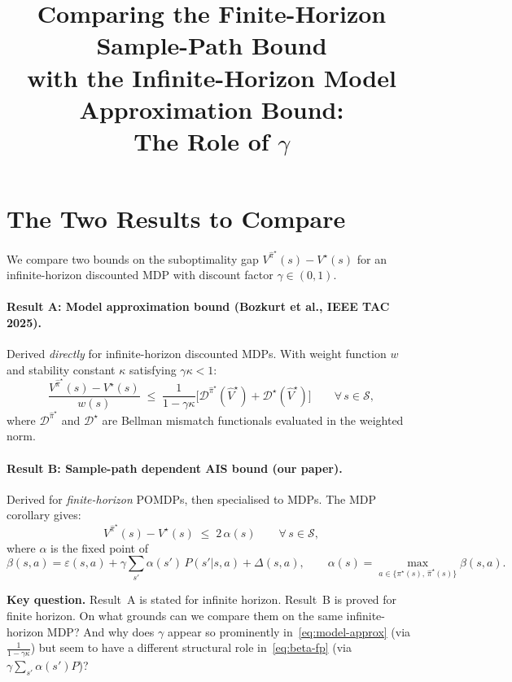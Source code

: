 \documentclass[11pt]{article}
\title{Comparing the Finite-Horizon Sample-Path Bound\\with the Infinite-Horizon Model Approximation Bound:\\The Role of $\gamma$}
\author{}
\date{}
\newcommand{\pistar}{\pi^\star}
\newcommand{\pihatstar}{\hat\pi^\star}
\newcommand{\Vstar}{V^\star}
\newcommand{\Vhatstar}{\hat V^\star}
\newcommand{\Vpihat}{V^{\pihatstar}}
\begin{document}
\maketitle

\section{The Two Results to Compare}

We compare two bounds on the suboptimality gap $\Vpihat(s) - \Vstar(s)$ for an
infinite-horizon discounted MDP with discount factor $\gamma \in (0,1)$.

\paragraph{Result A: Model approximation bound (Bozkurt et al., IEEE TAC 2025).}
Derived \emph{directly} for infinite-horizon discounted MDPs.  With weight
function $w$ and stability constant $\kappa$ satisfying $\gamma\kappa < 1$:
\begin{equation}\label{eq:model-approx}
  \frac{\Vpihat(s) - \Vstar(s)}{w(s)}
  \;\le\;
  \frac{1}{1 - \gamma\kappa}
  \bigl[\mathcal{D}^{\pihatstar}(\Vhatstar)
  + \mathcal{D}^\star(\Vhatstar)\bigr]
  \qquad \forall\, s \in \mathcal{S},
\end{equation}
where $\mathcal{D}^{\pihatstar}$ and $\mathcal{D}^\star$ are Bellman mismatch
functionals evaluated in the weighted norm.

\paragraph{Result B: Sample-path dependent AIS bound (our paper).}
Derived for \emph{finite-horizon} POMDPs, then specialised to MDPs.  The MDP
corollary gives:
\begin{equation}\label{eq:sample-path}
  \Vpihat(s) - \Vstar(s) \;\le\; 2\,\alpha(s) \qquad \forall\, s \in \mathcal{S},
\end{equation}
where $\alpha$ is the fixed point of
\begin{equation}\label{eq:beta-fp}
  \beta(s,a)
  = \varepsilon(s,a) + \gamma \sum_{s'} \alpha(s')\, P(s'|s,a) + \Delta(s,a),
  \qquad
  \alpha(s) = \max_{a \in \{\pistar(s),\, \pihatstar(s)\}} \beta(s,a).
\end{equation}

\medskip
\noindent
\textbf{Key question.}
Result~A is stated for infinite horizon.  Result~B is proved for finite
horizon.  On what grounds can we compare them on the same infinite-horizon MDP?
And why does $\gamma$ appear so prominently in~\eqref{eq:model-approx}
(via $\frac{1}{1-\gamma\kappa}$) but seem to have a different structural role
in~\eqref{eq:beta-fp} (via $\gamma \sum_{s'} \alpha(s') P$)?
\end{document}
